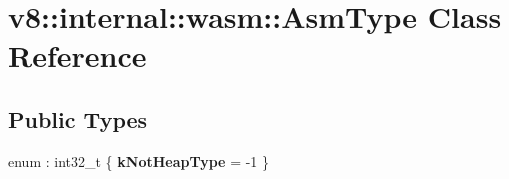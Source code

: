 \hypertarget{classv8_1_1internal_1_1wasm_1_1AsmType}{}\section{v8\+:\+:internal\+:\+:wasm\+:\+:Asm\+Type Class Reference}
\label{classv8_1_1internal_1_1wasm_1_1AsmType}
\subsection*{Public Types}
\begin{DoxyCompactItemize}
\item 
\mbox{\label{classv8_1_1internal_1_1wasm_1_1AsmType_a1a592b6b92c48302b5ad2076d41cc4ca}} 
enum \+: int32\+\_\+t \{ {\bfseries k\+Not\+Heap\+Type} = -\/1
 \}
\end{DoxyCompactItemize}
